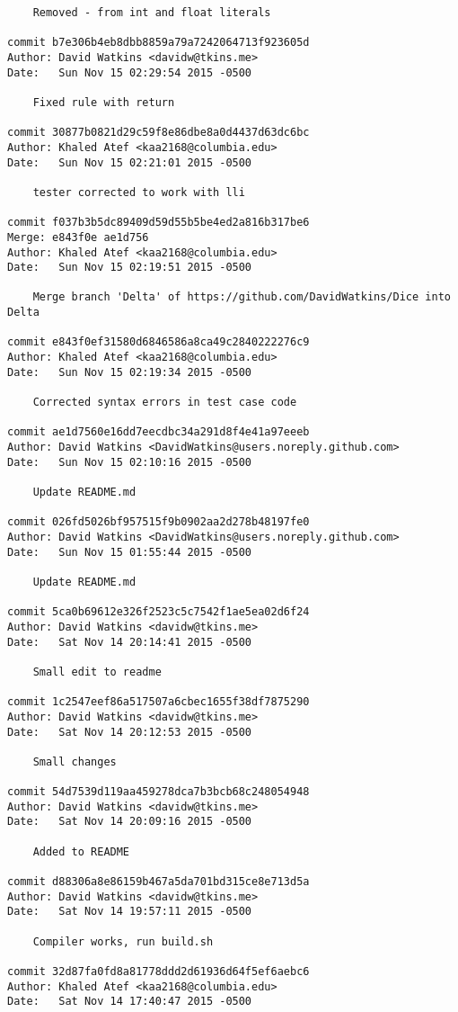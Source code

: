 \begin{verbatim}
    Removed - from int and float literals

commit b7e306b4eb8dbb8859a79a7242064713f923605d
Author: David Watkins <davidw@tkins.me>
Date:   Sun Nov 15 02:29:54 2015 -0500

    Fixed rule with return

commit 30877b0821d29c59f8e86dbe8a0d4437d63dc6bc
Author: Khaled Atef <kaa2168@columbia.edu>
Date:   Sun Nov 15 02:21:01 2015 -0500

    tester corrected to work with lli

commit f037b3b5dc89409d59d55b5be4ed2a816b317be6
Merge: e843f0e ae1d756
Author: Khaled Atef <kaa2168@columbia.edu>
Date:   Sun Nov 15 02:19:51 2015 -0500

    Merge branch 'Delta' of https://github.com/DavidWatkins/Dice into Delta

commit e843f0ef31580d6846586a8ca49c2840222276c9
Author: Khaled Atef <kaa2168@columbia.edu>
Date:   Sun Nov 15 02:19:34 2015 -0500

    Corrected syntax errors in test case code

commit ae1d7560e16dd7eecdbc34a291d8f4e41a97eeeb
Author: David Watkins <DavidWatkins@users.noreply.github.com>
Date:   Sun Nov 15 02:10:16 2015 -0500

    Update README.md

commit 026fd5026bf957515f9b0902aa2d278b48197fe0
Author: David Watkins <DavidWatkins@users.noreply.github.com>
Date:   Sun Nov 15 01:55:44 2015 -0500

    Update README.md

commit 5ca0b69612e326f2523c5c7542f1ae5ea02d6f24
Author: David Watkins <davidw@tkins.me>
Date:   Sat Nov 14 20:14:41 2015 -0500

    Small edit to readme

commit 1c2547eef86a517507a6cbec1655f38df7875290
Author: David Watkins <davidw@tkins.me>
Date:   Sat Nov 14 20:12:53 2015 -0500

    Small changes

commit 54d7539d119aa459278dca7b3bcb68c248054948
Author: David Watkins <davidw@tkins.me>
Date:   Sat Nov 14 20:09:16 2015 -0500

    Added to README

commit d88306a8e86159b467a5da701bd315ce8e713d5a
Author: David Watkins <davidw@tkins.me>
Date:   Sat Nov 14 19:57:11 2015 -0500

    Compiler works, run build.sh

commit 32d87fa0fd8a81778ddd2d61936d64f5ef6aebc6
Author: Khaled Atef <kaa2168@columbia.edu>
Date:   Sat Nov 14 17:40:47 2015 -0500


\end{verbatim}
